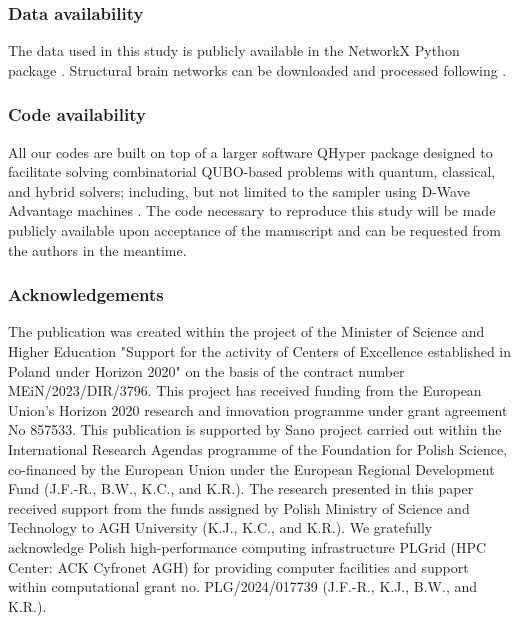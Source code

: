 \documentclass[pdflatex,sn-mathphys-num]{sn-jnl}%
\begin{document}

\subsubsection*{Data availability}
The data used in this study is publicly available in the NetworkX Python package \cite{hagberg2008}. Structural brain networks can be downloaded and processed following \cite{falco2024functional,Falcó-Roget_2024}.

\subsubsection*{Code availability}
All our codes are built on top of a larger software  QHyper package \cite{lamza_qhyper_2024} designed to facilitate solving combinatorial QUBO-based problems with quantum, classical, and hybrid solvers; including, but not limited to the sampler using D-Wave Advantage machines \citep{Johnson2011,King2022,King2023}. The code necessary to reproduce this study will be made publicly available upon acceptance of the manuscript and can be requested from the authors in the meantime.

\subsubsection*{Acknowledgements}
The publication was created within the project of the Minister of Science and Higher Education "Support for the activity of Centers of Excellence established in Poland under Horizon 2020" on the basis of the contract number MEiN/2023/DIR/3796. This project has received funding from the European Union’s Horizon 2020 research and innovation programme under grant agreement No 857533. This publication is supported by Sano project carried out within the International Research Agendas programme of the Foundation for Polish Science, co-financed by the European Union under the European Regional Development Fund (J.F.-R., B.W., K.C., and K.R.). The research presented in this paper received support from the funds assigned by Polish Ministry of Science and Technology to AGH University (K.J., K.C., and K.R.). We gratefully acknowledge Polish high-performance computing infrastructure PLGrid (HPC Center: ACK Cyfronet AGH) for providing computer facilities and support within computational grant no. PLG/2024/017739 (J.F.-R., K.J., B.W., and K.R.).
\end{document}
